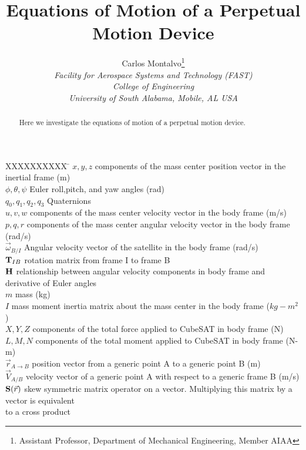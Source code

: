 \documentclass[]{aiaa-tc} %
\title{\bf Equations of Motion of a Perpetual Motion Device}
\author{
   Carlos Montalvo\thanks{Assistant Professor, Department of Mechanical
    Engineering, Member AIAA}\\
   {\normalsize\itshape Facility for Aerospace Systems and Technology (FAST)}\\
   {\normalsize\itshape College of Engineering}\\
{\normalsize\itshape
    University of South Alabama, Mobile, AL USA}}
\date{}
\begin{document}
\maketitle

\begin{abstract}

Here we investigate the equations of motion of a perpetual motion
device.

\end{abstract}


\begin{tabbing}
  XXXXXXXXXX \= \kill%
  $x,y,z$ \> components of the mass center position vector in the
  inertial frame (m)  \\
  $\phi,\theta,\psi$ \> Euler roll,pitch, and yaw angles (rad) \\
  $q_0,q_1,q_2,q_3$ \>  Quaternions \\  
  $u,v,w$ \> components of the mass center velocity vector in the
  body frame (m/s)  \\
  $p,q,r$ \> components of the mass center angular velocity vector in the
  body frame (rad/s)  \\
  $\vec{\omega}_{B/I}$ \> Angular velocity vector of the satellite in
  the body frame (rad/s) \\
  ${\bf T}_{IB}$ \> rotation matrix from frame I to frame B \\
  ${\bf H}$ \> relationship between angular velocity components in
  body frame and derivative of Euler angles \\
  $m$ \> mass (kg) \\
  $I$ \> mass moment inertia matrix about the mass center
  in the body frame ($kg-m^2$)  \\
  $X,Y,Z$ \> components of the total force applied to CubeSAT in
  body frame (N)  \\
  $L,M,N$ \> components of the total moment applied to CubeSAT in
  body frame (N-m)  \\
  ${\vec r}_{A\rightarrow B}$ \> position vector from a generic point A
  to a generic point B (m) \\
  ${\vec V}_{A/B}$ \> velocity vector of a generic point A
  with respect to a generic frame B (m/s) \\
  ${\bf S}(\vec{r})$ \> skew symmetric matrix operator on a
  vector. Multiplying this matrix by a vector is equivalent \\
  \> to a cross product\\
 \end{tabbing}
\end{document}
